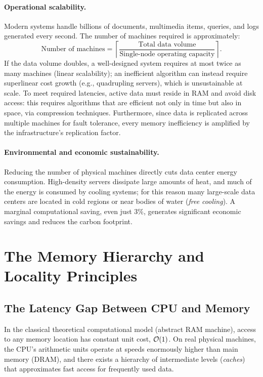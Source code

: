 \paragraph{Operational scalability.} Modern systems handle billions of documents, multimedia items, queries, and logs generated every second. The number of machines required is approximately:
\[
\text{Number of machines} = \left\lceil \frac{\text{Total data volume}}{\text{Single-node operating capacity}} \right\rceil.
\]
If the data volume doubles, a well-designed system requires at most twice as many machines (linear scalability); an inefficient algorithm can instead require superlinear cost growth (e.g., quadrupling servers), which is unsustainable at scale. To meet required latencies, active data must reside in RAM and avoid disk access: this requires algorithms that are efficient not only in time but also in space, via compression techniques. Furthermore, since data is replicated across multiple machines for fault tolerance, every memory inefficiency is amplified by the infrastructure's replication factor.

\paragraph{Environmental and economic sustainability.} Reducing the number of physical machines directly cuts data center energy consumption. High-density servers dissipate large amounts of heat, and much of the energy is consumed by cooling systems; for this reason many large-scale data centers are located in cold regions or near bodies of water (\textit{free cooling}). A marginal computational saving, even just $3\%$, generates significant economic savings and reduces the carbon footprint.

\FloatBarrier
\section{The Memory Hierarchy and Locality Principles}

\subsection{The Latency Gap Between CPU and Memory}

In the classical theoretical computational model (abstract RAM machine), access to any memory location has constant unit cost, $\mathcal{O}\!\left(1\right)$. On real physical machines, the CPU's arithmetic units operate at speeds enormously higher than main memory (DRAM), and there exists a hierarchy of intermediate levels (\textit{caches}) that approximates fast access for frequently used data.

